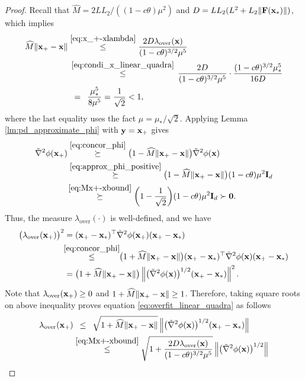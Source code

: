 \documentclass[11pt]{article}
\theoremstyle{plain}
\theoremstyle{definition}
\theoremstyle{remark}
\theoremstyle{plain}
\newcommand{\Norm}[1]{\left\| #1 \right\|}
\def\F{{\bf F}}
\def\I{{\bf I}}
\def\x{{\bf x}}
\def\y{{\bf y}}
\def\0{{\bf 0}}
\begin{document}
\begin{proof}
Recall that $\widehat M=2LL_2/((1-c\theta)\mu^2)$ and
$D=LL_2(L^2+L_2\|\F(\x_*)\|)$, which implies
\begin{align}
    \label{eq:Mx+-xbound}
    \begin{split}
\widehat M\|\x_{+}-\x\|
&\overset{\eqref{eq:x_+-xlambda}}{\leq}
\frac{2D\lambda_{\mathrm{over}}(\x)}{(1-c\theta)^{3/2}\mu^5} \\
&\,\overset{\eqref{eq:condi_x_linear_quadra}}{\leq}\,
\frac{2D}{(1-c\theta)^{3/2}\mu^5}
\cdot\frac{(1-c\theta)^{3/2}\mu_*^5}{16D}\\
&~\,=~\,\frac{\mu_*^5}{8\mu^5}
=\frac{1}{\sqrt{2}}<1,
\end{split}
\end{align}
where the last equality uses the fact $\mu=\mu_*/\sqrt{2}$.
Applying Lemma \ref{lm:pd_approximate_phi} with $\y=\x_{+}$ gives
\begin{align*}
\tilde{\nabla}^2\phi(\x_{+})
&\overset{\eqref{eq:concor_phi}}{\succeq}
\bigl(1-\widehat M\|\x_{+}-\x\|\bigr)
\tilde{\nabla}^2\phi(\x)\\
&\overset{\eqref{eq:approx_phi_positive}}{\succeq}
\bigl(1-\widehat M\|\x_{+}-\x\|\bigr)
    (1-c\theta)\mu^2\I_d\\
&\!\overset{\eqref{eq:Mx+-xbound}}{\succeq}\biggl(1-\frac{1}{\sqrt{2}}\biggr)
(1-c\theta)\mu^2\I_d\succ\0.
\end{align*}
Thus, the measure $\lambda_{\mathrm{over}}(\cdot)$ is well-defined, and we have
\begin{align*}
\bigl(\lambda_{\mathrm{over}}(\x_{+})\bigr)^2
&=(\x_{+}-\x_*)^{\top}\tilde{\nabla}^2\phi(\x_{+})(\x_{+}-\x_*)\\
&\!\!\overset{\eqref{eq:concor_phi}}{\leq}\!\!
\bigl(1+\widehat M\|\x_{+}-\x\|\bigr)
(\x_{+}-\x_*)^{\top}\tilde{\nabla}^2\phi(\x)(\x_{+}-\x_*)\\
&=\bigl(1+\widehat M\|\x_{+}-\x\|\bigr)
\Norm{\bigl(\tilde{\nabla}^2\phi(\x)\bigr)^{1/2}
(\x_{+}-\x_*)}^2.
\end{align*}
Note that $\lambda_{\mathrm{over}}(\x_{+})\geq0$ and
$1+\widehat M\|\x_{+}-\x\|\geq1$. Therefore, taking square roots on above inequality proves equation \eqref{eq:overfit_linear_quadra} as follows
\begin{align*}
\lambda_{\mathrm{over}}(\x_{+})
&\,~\leq~\,\sqrt{1+\widehat M\|\x_{+}-\x\|}
\Norm{\bigl(\tilde{\nabla}^2\phi(\x)\bigr)^{1/2}
(\x_{+}-\x_*)}\\
&\overset{\eqref{eq:Mx+-xbound}}{\leq}
\sqrt{1+\frac{2D\lambda_{\mathrm{over}}(\x)}{(1-c\theta)^{3/2}\mu^5}
}
\Norm{\bigl(\tilde{\nabla}^2\phi(\x)\bigr)^{1/2}
}
\end{align*}
\end{proof}
\end{document}
